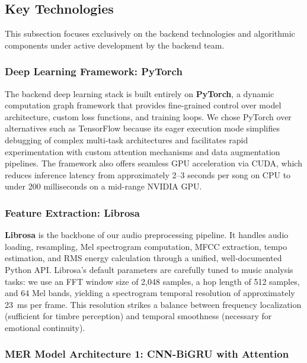 \documentclass[12pt,a4paper]{article}
\begin{document}
\subsection{Key Technologies}

This subsection focuses exclusively on the backend technologies and algorithmic components under active development by the backend team.

\subsubsection{Deep Learning Framework: PyTorch}

The backend deep learning stack is built entirely on \textbf{PyTorch}, a dynamic computation graph framework that provides fine-grained control over model architecture, custom loss functions, and training loops. We chose PyTorch over alternatives such as TensorFlow because its eager execution mode simplifies debugging of complex multi-task architectures and facilitates rapid experimentation with custom attention mechanisms and data augmentation pipelines. The framework also offers seamless GPU acceleration via CUDA, which reduces inference latency from approximately 2--3 seconds per song on CPU to under 200 milliseconds on a mid-range NVIDIA GPU. \\

\subsubsection{Feature Extraction: Librosa}

\textbf{Librosa} is the backbone of our audio preprocessing pipeline. It handles audio loading, resampling, Mel spectrogram computation, MFCC extraction, tempo estimation, and RMS energy calculation through a unified, well-documented Python API. Librosa's default parameters are carefully tuned to music analysis tasks: we use an FFT window size of 2,048 samples, a hop length of 512 samples, and 64 Mel bands, yielding a spectrogram temporal resolution of approximately 23~ms per frame. This resolution strikes a balance between frequency localization (sufficient for timbre perception) and temporal smoothness (necessary for emotional continuity).

\subsubsection{MER Model Architecture 1: CNN-BiGRU with Attention}
\end{document}
